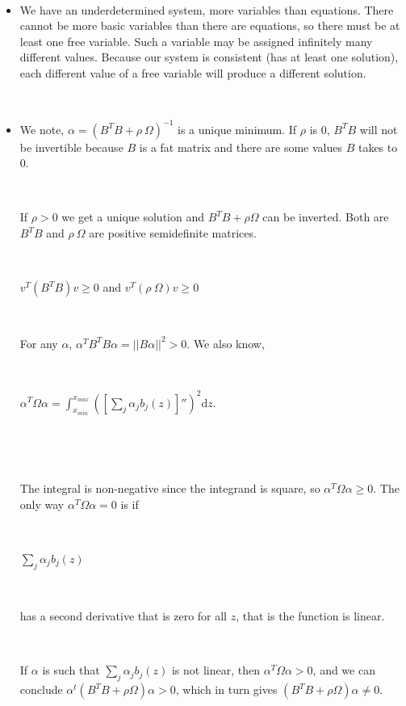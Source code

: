 \documentclass[]{article}
\begin{document}
~

\begin{itemize} \item[ ] 
 We have an underdetermined system, more variables than equations. There cannot be more basic variables than there are equations, so there must be at least one free variable. Such a variable may be assigned infinitely many different values. Because our system is consistent (has at least one solution), each different value of a free variable will produce a different solution. 
\end{itemize}

~

\begin{itemize}    \item[] 

We note, $\alpha = \left( B^TB+\rho \ \Omega \right)^{-1}$ is a unique minimum. If $\rho$ is 0, $B^TB$ will not be invertible because $B$ is a fat matrix and there are some values $B$ takes to 0.

\ 

If $\rho>0$ we get a unique solution and $B^TB+\rho \Omega$ can be inverted. Both are $B^TB$ and $\rho \ \Omega$ are positive semidefinite matrices.

\ 

\hfil \( \displaystyle v^T(B^TB)v \geq 0 \) and \( \displaystyle v^T(\rho \ \Omega)v \geq 0\) 

\ 

For any $\alpha$, $\alpha^TB^TB\alpha = ||B\alpha||^2 > 0$. We also know,

\ 

\hfil \(\displaystyle \alpha^T \Omega \alpha = \int_{x_{min}}^{x_{max}} \left( \left[ \sum_j \alpha_j b_j(z) \right]'' \right)^2 \text{d}z. \)

\ 

\ 

The integral is non-negative since the integrand is square, so $\alpha^T \Omega \alpha \geq 0$. The only way $\alpha^T \Omega \alpha = 0$ is if 

\ 

\hfil \( \displaystyle \sum_j \alpha_j b_j(z) \)

\ 

has a second derivative that is zero for all $z$, that is the function is linear. 

\ 

If $\alpha$ is such that \( \displaystyle \sum_j \alpha_j b_j(z) \) is not linear, then $\alpha^T \Omega \alpha  > 0$, and we can conclude $\alpha^t \left(B^TB+\rho \Omega\right) \alpha >0$, which in turn gives $\left(B^TB+\rho \Omega \right)\alpha \neq 0$.


\end{itemize}
\end{document}
